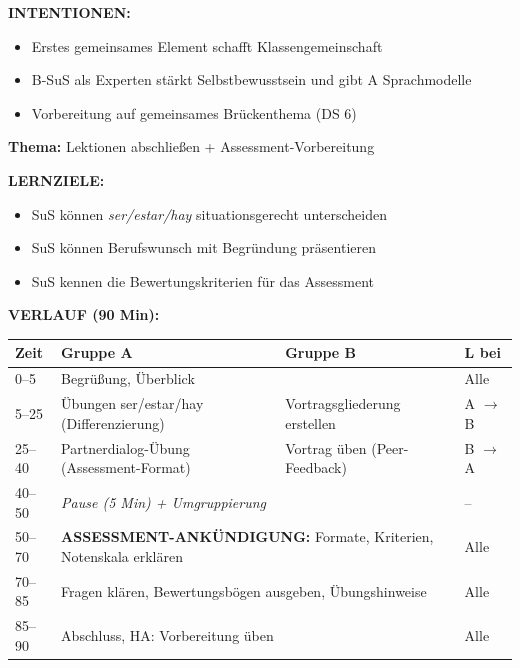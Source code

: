 \documentclass[11pt, a4paper]{article}
\newcommand{\es}[1]{\textcolor{spanisch}{\textit{#1}}}
\begin{document}
\begin{dsbox}[title={DS 2 -- Fortführung + Übergang (Di, 06.01.2026)}]
\vspace{0.2cm}

\textbf{INTENTIONEN:}
\begin{itemize}[leftmargin=1.5em, nosep]
    \item Erstes gemeinsames Element schafft Klassengemeinschaft
    \item B-SuS als Experten stärkt Selbstbewusstsein und gibt A Sprachmodelle
    \item Vorbereitung auf gemeinsames Brückenthema (DS 6)
\end{itemize}

\end{dsbox}

\vspace{0.4cm}

\begin{dsbox}[title={DS 3 -- Bucharbeit + Assessment-Ankündigung (Mo, 12.01.2026)}]

\textbf{Thema:} Lektionen abschließen + Assessment-Vorbereitung

\vspace{0.3cm}

\textbf{LERNZIELE:}
\begin{itemize}[leftmargin=1.5em, nosep]
    \item[\textcolor{gruppeA}{A:}] SuS können \es{ser/estar/hay} situationsgerecht unterscheiden
    \item[\textcolor{gruppeB}{B:}] SuS können Berufswunsch mit Begründung präsentieren
    \item[Alle:] SuS kennen die Bewertungskriterien für das Assessment
\end{itemize}

\vspace{0.2cm}

\textbf{VERLAUF (90 Min):}

\begin{tabular}{|p{1.2cm}|p{5.5cm}|p{5.5cm}|p{1.5cm}|}
\hline
\rowcolor{hellgrau}
\textbf{Zeit} & \textbf{Gruppe A} & \textbf{Gruppe B} & \textbf{L bei} \\
\hline
0--5 & \multicolumn{2}{l|}{Begrüßung, Überblick} & Alle \\
\hline
5--25 & Übungen ser/estar/hay (Differenzierung) & Vortragsgliederung erstellen & A $\rightarrow$ B \\
\hline
25--40 & Partnerdialog-Übung (Assessment-Format) & Vortrag üben (Peer-Feedback) & B $\rightarrow$ A \\
\hline
40--50 & \multicolumn{2}{l|}{\textit{Pause (5 Min) + Umgruppierung}} & -- \\
\hline
50--70 & \multicolumn{2}{l|}{\textbf{ASSESSMENT-ANKÜNDIGUNG:} Formate, Kriterien, Notenskala erklären} & Alle \\
\hline
70--85 & \multicolumn{2}{l|}{Fragen klären, Bewertungsbögen ausgeben, Übungshinweise} & Alle \\
\hline
85--90 & \multicolumn{2}{l|}{Abschluss, HA: Vorbereitung üben} & Alle \\
\hline
\end{tabular}


\end{dsbox}
\end{document}
